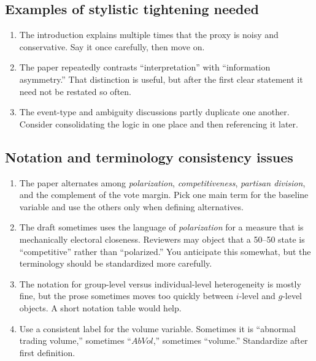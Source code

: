\documentclass[11pt]{article}
\begin{document}
\subsection*{Examples of stylistic tightening needed}
\begin{enumerate}
    \item The introduction explains multiple times that the proxy is noisy and conservative. Say it once carefully, then move on.
    \item The paper repeatedly contrasts ``interpretation'' with ``information asymmetry.'' That distinction is useful, but after the first clear statement it need not be restated so often.
    \item The event-type and ambiguity discussions partly duplicate one another. Consider consolidating the logic in one place and then referencing it later.
\end{enumerate}

\subsection*{Notation and terminology consistency issues}
\begin{enumerate}
    \item The paper alternates among \emph{polarization}, \emph{competitiveness}, \emph{partisan division}, and the complement of the vote margin. Pick one main term for the baseline variable and use the others only when defining alternatives.
    \item The draft sometimes uses the language of \emph{polarization} for a measure that is mechanically electoral closeness. Reviewers may object that a 50--50 state is ``competitive'' rather than ``polarized.'' You anticipate this somewhat, but the terminology should be standardized more carefully.
    \item The notation for group-level versus individual-level heterogeneity is mostly fine, but the prose sometimes moves too quickly between $i$-level and $g$-level objects. A short notation table would help.
    \item Use a consistent label for the volume variable. Sometimes it is ``abnormal trading volume,'' sometimes ``$AbVol$,'' sometimes ``volume.'' Standardize after first definition.
\end{enumerate}
\end{document}
